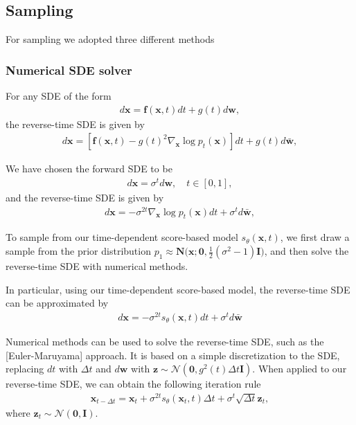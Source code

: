\documentclass{article}
\begin{document}
\subsection{Sampling}
For sampling we adopted three different methods
\subsubsection{Numerical SDE solver}
For any SDE of the form
\begin{align*}
d \mathbf{x} = \mathbf{f}(\mathbf{x}, t) dt + g(t) d\mathbf{w},
\end{align*}
the reverse-time SDE is given by
\begin{align*}
d \mathbf{x} = [\mathbf{f}(\mathbf{x}, t) - g(t)^2 \nabla_\mathbf{x} \log p_t(\mathbf{x})] dt + g(t) d \bar{\mathbf{w}},
\end{align*}

We have chosen the forward SDE to be
\begin{align*}
d \mathbf{x} = \sigma^t d\mathbf{w}, \quad t\in[0,1],
\end{align*}
and the reverse-time SDE is given by
\begin{align*}
d\mathbf{x} = -\sigma^{2t} \nabla_\mathbf{x} \log p_t(\mathbf{x}) dt + \sigma^t d \bar{\mathbf{w}},
\end{align*}

To sample from our time-dependent score-based model \(s_\theta(\mathbf{x}, t)\), we first draw a sample from the prior distribution \(p_1 \approx \mathbf{N}\bigg(\mathbf{x}; \mathbf{0}, \frac{1}{2}(\sigma^{2} - 1) \mathbf{I}\bigg)\), and then solve the reverse-time SDE with numerical methods.

In particular, using our time-dependent score-based model, the reverse-time SDE can be approximated by
\begin{align*}
d\mathbf{x} = -\sigma^{2t} s_\theta(\mathbf{x}, t) dt + \sigma^t d \bar{\mathbf{w}}
\end{align*}

Numerical methods can be used to solve the reverse-time SDE, such as the [Euler-Maruyama] approach. It is based on a simple discretization to the SDE, replacing \(dt\) with \(\Delta t\) and \(d \mathbf{w}\) with \(\mathbf{z} \sim \mathcal{N}(\mathbf{0}, g^2(t) \Delta t \mathbf{I})\). When applied to our reverse-time SDE, we can obtain the following iteration rule
\begin{align}
\mathbf{x}_{t-\Delta t} = \mathbf{x}_t + \sigma^{2t} s_\theta(\mathbf{x}_t, t)\Delta t + \sigma^t\sqrt{\Delta t} \mathbf{z}_t,
\end{align}
where \(\mathbf{z}_t \sim \mathcal{N}(\mathbf{0}, \mathbf{I})\).
\end{document}
